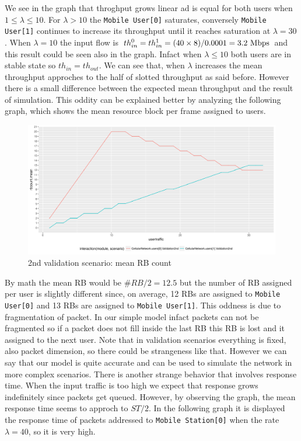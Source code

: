 We see in the graph that throghput grows linear ad is equal for both users when \(1 \leq \lambda \leq 10 \). For \(\lambda > 10 \) the \texttt{Mobile User[0]} saturates, conversely \texttt{Mobile User[1]} continues to increase its throughput until it reaches saturation at \(\lambda = 30\).
When \(\lambda = 10 \) the input flow is \(th_{in}^{0} = th_{in}^{1} = (40 \times 8)/0.0001 = 3.2\textnormal{ Mbps}\) and this result could be seen also in the graph. Infact when \(\lambda \le 10 \) both users are in stable state so \(th_{in} = th_{out}\). We can see that, when \(\lambda\) increases the mean throughput approches to the half of slotted throughput as said before. However there is a small difference between the expected mean throughput and the result of simulation. This oddity can be explained better by analyzing the following graph, which shows the mean resource block per frame assigned to users.
\begin{figure}[H]
  \includegraphics[width=1\textwidth]{images/rb-val2-val2-0-1}
  \caption{2nd validation scenario: mean RB count}
  \label{fig:2nd validation scenario: mean RB count}
\end{figure}
By math the mean RB would be \(\#RB / 2 = 12.5 \) but the number of RB assigned per user is slightly different since, on average, 12 RBs are assigned to \texttt{Mobile User[0]} and 13 RBs are assigned to \texttt{Mobile User[1]}. This oddness is due to fragmentation of packet. In our simple model infact packets can not be fragmented so if a packet does not fill inside the last RB this RB is lost and it assigned to the next user. Note that in validation scenarios everything is fixed, also packet dimension, so there could be strangeness like that. However we can say that our model is quite accurate and can be used to simulate the network in more complex scenarios. 
There is another strange behavior that involves response time. When the input traffic is too high we expect that response grows indefinitely since packets get queued. However, by observing the graph, the mean response time seems to approch to \(ST/2\). In the following graph it is displayed the response time of packets addressed to \texttt{Mobile Station[0]} when the rate \(\lambda = 40\), so it is very high.
